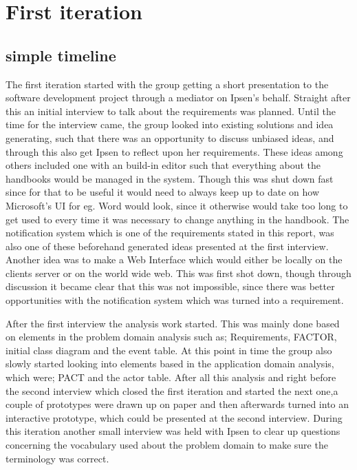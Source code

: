 \section{First iteration}
\subsection{simple timeline}
The first iteration started with the group getting a short presentation to the software development project through a mediator on Ipsen's behalf.
Straight after this an initial interview to talk about the requirements was planned.
Until the time for the interview came, the group looked into existing solutions and idea generating, such that there was an opportunity to discuss unbiased ideas, and through this also get Ipsen to reflect upon her requirements.
These ideas among others included one with an build-in editor such that everything about the handbooks would be managed in the system.
Though this was shut down fast since for that to be useful it would need to always keep up to date on how Microsoft's UI for eg. Word would look, since it otherwise would take too long to get used to every time it was necessary to change anything in the handbook.
The notification system which is one of the requirements stated in this report, was also one of these beforehand generated ideas presented at the first interview. 
Another idea was to make a Web Interface which would either be locally on the clients server or on the world wide web. This was first shot down, though through discussion it became clear that this was not impossible, since there was better opportunities with the notification system which was turned into a requirement.

After the first interview the analysis work started.
This was mainly done based on elements in the problem domain analysis such as; Requirements, FACTOR, initial class diagram and the event table.
At this point in time the group also slowly started looking into elements based in the application domain analysis, which were; PACT and the actor table.
After all this analysis and right before the second interview which closed the first iteration and started the next one,a couple of prototypes were drawn up on paper and then afterwards turned into an interactive prototype, which could be presented at the second interview.
During this iteration another small interview was held with Ipsen to clear up questions concerning the vocabulary used about the problem domain to make sure the terminology was correct.

